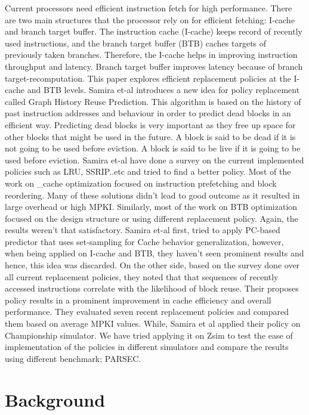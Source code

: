 \documentclass[11pt]{article}
\begin{document}
Current processors need efficient instruction fetch for high performance. There are two main structures that the processor rely on for efficient fetching: I-cache and branch
target buffer. The instruction cache (I-cache) keeps record of recently used instructions, and the branch target buffer (BTB) caches targets of previously taken branches.
Therefore, the I-cache helps in improving instruction throughput and latency. Branch target buffer improves latency because of branch target-recomputation. This 
paper \cite{samira-ISCA18} explores efficient replacement policies at the I-cache and BTB levels. Samira et-al introduces a new idea for policy replacement called Graph History
Reuse Prediction. This algorithm is based on the history of past instruction addresses and behaviour in order to predict dead blocks in an efficient way. Predicting dead blocks
is very important as they free up space for other blocks that might be used in the future. A block is said to be dead if it is not going to be used before eviction. A block is 
said to be live if it is going to be used before eviction. Samira et-al have done a survey on the current implemented policies such as LRU, SSRIP..etc and tried to find a 
better policy. Most of the work on _cache optimization focused on instruction prefetching and block reordering. Many of these solutions didn’t lead to good  outcome as it 
resulted in large overhead or high MPKI. Similarly, most of the work on BTB optimization focused on the design structure or using different replacement policy. Again, the 
results weren’t that satisfactory. 
Samira et-al first, tried to apply PC-based predictor that uses set-sampling for Cache behavior generalization, however, when being applied on I-cache and BTB, they haven’t 
seen prominent results and hence, this idea was discarded. On the other side,  based on the survey done over all current replacement policies, they noted that that sequences of
recently accessed instructions correlate with the likelihood of block reuse. Their proposes policy results in a prominent improvement in cache efficiency and overall 
performance. They evaluated seven recent replacement policies and compared them based on average MPKI values. While, Samira et al applied their policy on Championship 
simulator. We have tried applying it on Zsim to test the ease of implementation of the policies in different simulators and compare the results using different benchmark; 
PARSEC.


\section{Background}
\label{sec:background}
\end{document}
